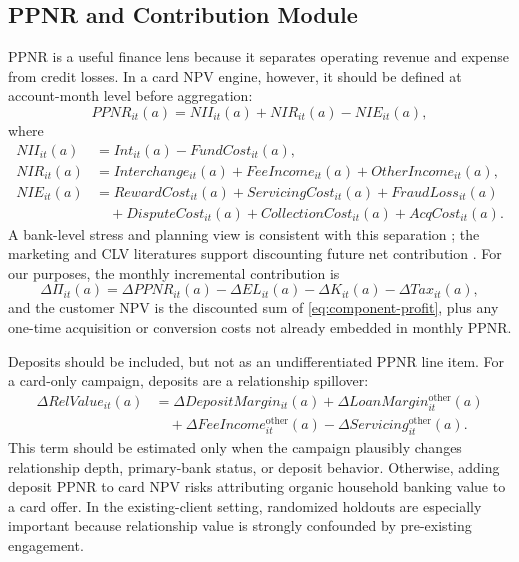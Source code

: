 \documentclass[11pt]{article}
\newcommand{\1}{\mathbf{1}}
\begin{document}
\subsection{PPNR and Contribution Module}
\label{subsec:ppnr-module}

PPNR is a useful finance lens because it separates operating revenue and
expense from credit losses. In a card NPV engine, however, it should be defined
at account-month level before aggregation:
\begin{equation}
  PPNR_{it}(a)
  =
  NII_{it}(a)
  + NIR_{it}(a)
  - NIE_{it}(a),
  \label{eq:ppnr}
\end{equation}
where
\begin{align}
  NII_{it}(a)
    &= Int_{it}(a)-FundCost_{it}(a), \label{eq:nii}\\
  NIR_{it}(a)
    &= Interchange_{it}(a)+FeeIncome_{it}(a)+OtherIncome_{it}(a),
       \label{eq:nir}\\
  NIE_{it}(a)
    &= RewardCost_{it}(a)+ServicingCost_{it}(a)+FraudLoss_{it}(a)
       \nonumber\\
    &\quad
       +DisputeCost_{it}(a)+CollectionCost_{it}(a)+AcqCost_{it}(a).
       \label{eq:nie}
\end{align}
A bank-level stress and planning view is consistent with this separation
\citep{federalreserve2025stressmethodology,federalreserve2026stressmethodology};
the marketing and CLV literatures support discounting future net contribution
\citep{berger1998clv,rust2004return,venkatesan2004clv}.
For our purposes, the monthly incremental contribution is
\begin{equation}
  \Delta \Pi_{it}(a)
  =
  \Delta PPNR_{it}(a)
  - \Delta EL_{it}(a)
  - \Delta K_{it}(a)
  - \Delta Tax_{it}(a),
  \label{eq:component-profit}
\end{equation}
and the customer NPV is the discounted sum of
\eqref{eq:component-profit}, plus any one-time acquisition or conversion costs
not already embedded in monthly PPNR.

Deposits should be included, but not as an undifferentiated PPNR line item. For
a card-only campaign, deposits are a relationship spillover:
\begin{align}
  \Delta RelValue_{it}(a)
  &=
  \Delta DepositMargin_{it}(a)
  + \Delta LoanMargin^{\mathrm{other}}_{it}(a)
  \nonumber\\
  &\quad
  + \Delta FeeIncome^{\mathrm{other}}_{it}(a)
  - \Delta Servicing^{\mathrm{other}}_{it}(a).
  \label{eq:relationship-value}
\end{align}
This term should be estimated only when the campaign plausibly changes
relationship depth, primary-bank status, or deposit behavior. Otherwise, adding
deposit PPNR to card NPV risks attributing organic household banking value to a
card offer. In the existing-client setting, randomized holdouts are especially
important because relationship value is strongly confounded by pre-existing
engagement.
\end{document}
